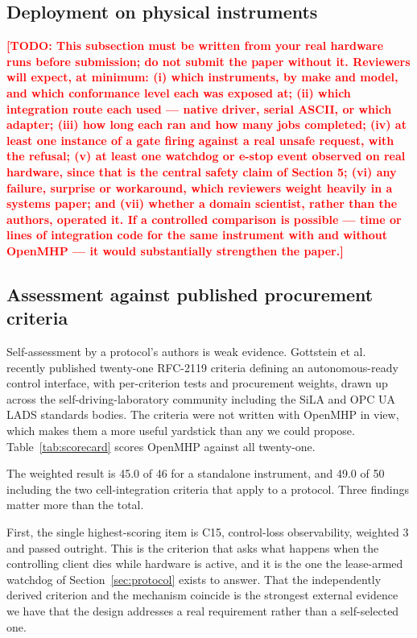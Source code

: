 \documentclass[11pt]{article}
\newcommand{\TODO}[1]{\textcolor{red}{\textbf{[TODO: #1]}}}
\begin{document}
\subsection{Deployment on physical instruments}
\TODO{This subsection must be written from your real hardware runs before submission; do not
submit the paper without it. Reviewers will expect, at minimum: (i) which instruments, by
make and model, and which conformance level each was exposed at; (ii) which integration route
each used --- native driver, serial ASCII, or which adapter; (iii) how long each ran and how
many jobs completed; (iv) at least one instance of a gate firing against a real unsafe
request, with the refusal; (v) at least one watchdog or e-stop event observed on real
hardware, since that is the central safety claim of Section 5; (vi) any failure, surprise or
workaround, which reviewers weight heavily in a systems paper; and (vii) whether a domain
scientist, rather than the authors, operated it. If a controlled comparison is possible ---
time or lines of integration code for the same instrument with and without OpenMHP --- it
would substantially strengthen the paper.}

\subsection{Assessment against published procurement criteria}
\label{sec:scorecard}

Self-assessment by a protocol's authors is weak evidence. Gottstein et al.~\cite{gottstein2026}
recently published twenty-one RFC-2119 criteria defining an autonomous-ready control
interface, with per-criterion tests and procurement weights, drawn up across the
self-driving-laboratory community including the SiLA and OPC UA LADS standards bodies. The
criteria were not written with OpenMHP in view, which makes them a more useful yardstick than
any we could propose. Table~\ref{tab:scorecard} scores OpenMHP against all twenty-one.

The weighted result is 45.0 of 46 for a standalone instrument, and 49.0 of 50 including the
two cell-integration criteria that apply to a protocol. Three findings matter more than the
total.

First, the single highest-scoring item is C15, control-loss observability, weighted 3 and
passed outright. This is the criterion that asks what happens when the controlling client
dies while hardware is active, and it is the one the lease-armed watchdog of
Section~\ref{sec:protocol} exists to answer. That the independently derived criterion and the
mechanism coincide is the strongest external evidence we have that the design addresses a
real requirement rather than a self-selected one.
\end{document}
